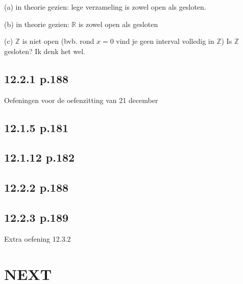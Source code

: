 \documentclass{article}
\begin{document}
(a) in theorie gezien: lege verzameling is zowel open als gesloten. 

(b) in theorie gezien: $\mathbb{R}$ is zowel open als gesloten

(c) $\mathbb{Z}$ is niet open (bvb. rond $x=0$ vind je geen interval volledig in  $\mathbb{Z}$)
Is $\mathbb{Z}$ gesloten? Ik denk het wel. 

\subsection{12.2.1 p.188} 


Oefeningen voor de oefenzitting van 21 december

\subsection{12.1.5 p.181} 
\subsection{12.1.12 p.182}

\subsection{12.2.2 p.188} 
\subsection{12.2.3 p.189} 


Extra oefening 12.3.2


\section*{NEXT}
\end{document}
